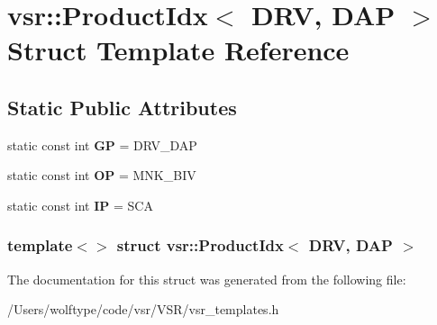 \hypertarget{structvsr_1_1_product_idx_3_01_d_r_v_00_01_d_a_p_01_4}{\section{vsr\-:\-:Product\-Idx$<$ D\-R\-V, D\-A\-P $>$ Struct Template Reference}
\label{structvsr_1_1_product_idx_3_01_d_r_v_00_01_d_a_p_01_4}
}
\subsection*{Static Public Attributes}
\begin{DoxyCompactItemize}
\item 
\hypertarget{structvsr_1_1_product_idx_3_01_d_r_v_00_01_d_a_p_01_4_afb6b073ccf1cd0727ec6e1192fd0880d}{static const int {\bfseries G\-P} = D\-R\-V\-\_\-\-D\-A\-P}\label{structvsr_1_1_product_idx_3_01_d_r_v_00_01_d_a_p_01_4_afb6b073ccf1cd0727ec6e1192fd0880d}

\item 
\hypertarget{structvsr_1_1_product_idx_3_01_d_r_v_00_01_d_a_p_01_4_ad5d913f5adc70a068f086425752b02e2}{static const int {\bfseries O\-P} = M\-N\-K\-\_\-\-B\-I\-V}\label{structvsr_1_1_product_idx_3_01_d_r_v_00_01_d_a_p_01_4_ad5d913f5adc70a068f086425752b02e2}

\item 
\hypertarget{structvsr_1_1_product_idx_3_01_d_r_v_00_01_d_a_p_01_4_a0f1666599f0b73aaa947fce137fced02}{static const int {\bfseries I\-P} = S\-C\-A}\label{structvsr_1_1_product_idx_3_01_d_r_v_00_01_d_a_p_01_4_a0f1666599f0b73aaa947fce137fced02}

\end{DoxyCompactItemize}
\subsubsection*{template$<$$>$ struct vsr\-::\-Product\-Idx$<$ D\-R\-V, D\-A\-P $>$}



The documentation for this struct was generated from the following file\-:\begin{DoxyCompactItemize}
\item 
/\-Users/wolftype/code/vsr/\-V\-S\-R/vsr\-\_\-templates.\-h\end{DoxyCompactItemize}
